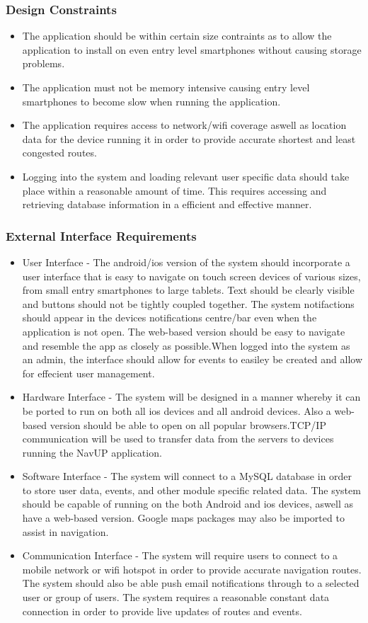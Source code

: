 \documentclass{article}
\begin{document}
\subsubsection{Design Constraints}
\begin{itemize}
	\item The application should be within certain size contraints as to allow the application to 				install on even entry level smartphones without causing storage problems.
    \item The application must not be memory intensive causing entry level smartphones to become slow 			when running the application.
    \item The application requires access to network/wifi coverage aswell as location data for the 				device running it in order to provide accurate shortest and least congested routes.
    \item Logging into the system and loading relevant user specific data should take place within a 				reasonable amount of time. This requires accessing and retrieving database information in a 			efficient and effective manner.
\end{itemize}
\subsubsection{External Interface Requirements}
\begin{itemize}
	\item User Interface - The android/ios version of the system should incorporate a user interface that is easy to navigate on touch screen devices of various sizes, from small entry smartphones to large tablets. Text should be clearly visible and buttons should not be tightly coupled together. The system notifactions should appear in the devices notifications centre/bar even when the application is not open. The web-based version should be easy to navigate and resemble the app as closely as possible.When logged into the system as an admin, the interface should allow for events to easiley be created and allow for effecient user management.
    \item Hardware Interface - The system will be designed in a manner whereby it can be ported to run on both all ios devices and all android devices. Also a web-based version should be able to open on all popular browsers.TCP/IP communication will be used to transfer data from the servers to devices running the NavUP application.
    \item Software Interface - The system will connect to a MySQL database in order to store user data, events, and other module specific related data. The system should be capable of running on the both Android and ios devices, aswell as have a web-based version. Google maps packages may also be imported to assist in navigation.
    \item Communication Interface - The system will require users to connect to a mobile network or wifi hotspot in order to provide accurate navigation routes. The system should also be able push email notifications through to a selected user or group of users. The system requires a reasonable constant data connection in order to provide live updates of routes and events.
\end{itemize}
\end{document}
